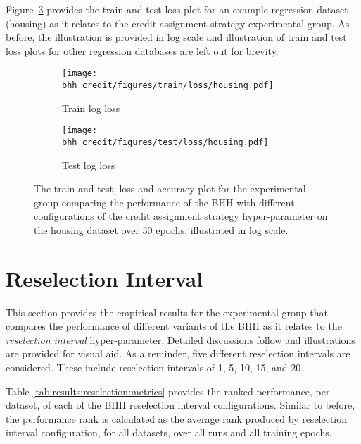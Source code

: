 Figure~\ref{fig:results:credit:figures:housing} provides the train and test loss plot for an example regression dataset (housing) as it relates to the credit assignment strategy experimental group. As before, the illustration is provided in log scale and illustration of train and test loss plots for other regression databases are left out for brevity.

\begin{figure}[htbp]
	\begin{subfigure}{0.5\textwidth}
		\centering
		\texttt{[image: bhh\_credit/figures/train/loss/housing.pdf]}
		\caption{Train log loss}
		\label{fig:results:credit:figures:loss:train:housing}
	\end{subfigure}
	\begin{subfigure}{0.5\textwidth}
		\centering
		\texttt{[image: bhh\_credit/figures/test/loss/housing.pdf]}
		\caption{Test log loss}
		\label{fig:results:credit:figures:loss:test:housing}
	\end{subfigure}
	\par\bigskip
	\caption{The train and test, loss and accuracy plot for the experimental group comparing the performance of the \acs{BHH} with different configurations of the credit assignment strategy hyper-parameter on the housing dataset over 30 epochs, illustrated in log scale.}
	\label{fig:results:credit:figures:housing}
\end{figure}



\section{Reselection Interval}\label{sec:results:reselection}

This section provides the empirical results for the experimental group that compares the performance of different variants of the \acs{BHH} as it relates to the \textit{reselection interval} hyper-parameter. Detailed discussions follow and illustrations are provided for visual aid. As a reminder, five different reselection intervals are considered. These include reselection intervals of 1, 5, 10, 15, and 20.

Table \ref{tab:results:reselection:metrics} provides the ranked performance, per dataset, of each of the \acs{BHH} reselection interval configurations. Similar to before, the performance rank is calculated as the average rank produced by reselection interval configuration, for all datasets, over all runs and all training epochs.

